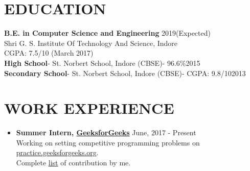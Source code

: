 \documentclass[line, margin]{res}
\begin{document}
\address{\href{mailto: sajal.agrawal1997@gmail.com}{sajal.agrawal1997@gmail.com}\\ +918878155869}
\begin{resume}

\section{EDUCATION}
\textbf{B.E. in Computer Science and Engineering} \hfill 2019(Expected)\\
Shri G. S. Institute Of Technology And Science, Indore\\
CGPA: 7.5/10 (March 2017)\\
\textbf{High School}- St. Norbert School, Indore (CBSE)- 96.6\%\hfill 2015\\
\textbf{Secondary School}- St. Norbert School, Indore (CBSE)- CGPA: 9.8/10\hfill 2013\\

\section{WORK EXPERIENCE}
\begin{itemize}
\item \textbf{Summer Intern, \href{http://www.geeksforgeeks.org}{GeeksforGeeks}} \hfill June, 2017 - Present\\Working on setting competitive programming problems on \href{http://practice.geeksforgeeks.org/}{practice.geeksforgeeks.org}.\\Complete \href{https://drive.google.com/open?id=150YyyLzaqZVhkNDS19aG1i4u6s5tZCS1n3GMEuXRi1M}{list} of contribution by me.
\end{itemize}


\end{resume}
\end{document}
